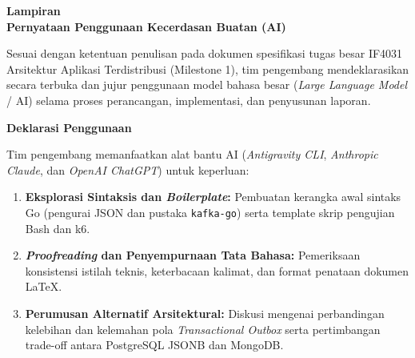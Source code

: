 \clearpage
{}
\label{chap:ai_declaration}

\begin{center}
    {\Large\bfseries Lampiran \thechapter}\\[0.3cm]
    {\LARGE\bfseries Pernyataan Penggunaan Kecerdasan Buatan (AI)}
\end{center}
\vspace{0.4cm}

\begin{small}
\begin{singlespacing}
Sesuai dengan ketentuan penulisan pada dokumen spesifikasi tugas besar IF4031 Arsitektur Aplikasi Terdistribusi (Milestone 1), tim pengembang mendeklarasikan secara terbuka dan jujur penggunaan model bahasa besar (\textit{Large Language Model} / AI) selama proses perancangan, implementasi, dan penyusunan laporan.

\vspace{0.3cm}
\noindent\textbf{\large Deklarasi Penggunaan}\par
\vspace{0.1cm}
Tim pengembang memanfaatkan alat bantu AI (\textit{Antigravity CLI}, \textit{Anthropic Claude}, dan \textit{OpenAI ChatGPT}) untuk keperluan:
\begin{enumerate}[noitemsep, topsep=1pt, parsep=0pt]
    \item \textbf{Eksplorasi Sintaksis dan \textit{Boilerplate}:} Pembuatan kerangka awal sintaks Go (pengurai JSON dan pustaka \texttt{kafka-go}) serta template skrip pengujian Bash dan k6.
    \item \textbf{\textit{Proofreading} dan Penyempurnaan Tata Bahasa:} Pemeriksaan konsistensi istilah teknis, keterbacaan kalimat, dan format penataan dokumen LaTeX.
    \item \textbf{Perumusan Alternatif Arsitektural:} Diskusi mengenai perbandingan kelebihan dan kelemahan pola \textit{Transactional Outbox} serta pertimbangan trade-off antara PostgreSQL JSONB dan MongoDB.
\end{enumerate}


\end{singlespacing}
\end{small}
